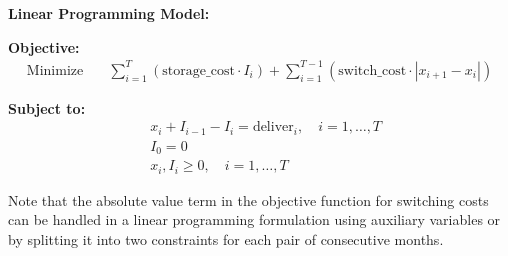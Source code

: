 \documentclass{article}
\begin{document}
\textbf{Linear Programming Model:}

\textbf{Objective:}
\begin{align*}
\text{Minimize} \quad & \sum_{i=1}^{T} \left( \text{storage\_cost} \cdot I_i \right) + \sum_{i=1}^{T-1} \left( \text{switch\_cost} \cdot |x_{i+1} - x_i| \right)
\end{align*}

\textbf{Subject to:}
\begin{align*}
& x_i + I_{i-1} - I_i = \text{deliver}_i, \quad i = 1, \ldots, T \\
& I_0 = 0 \\
& x_i, I_i \geq 0, \quad i = 1, \ldots, T
\end{align*}

Note that the absolute value term in the objective function for switching costs can be handled in a linear programming formulation using auxiliary variables or by splitting it into two constraints for each pair of consecutive months.
\end{document}
